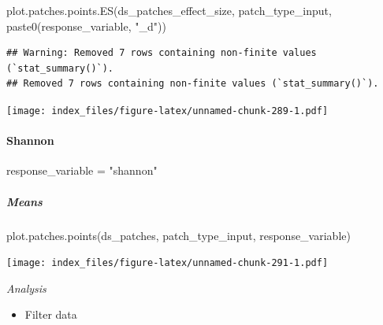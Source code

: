 \documentclass[
]{article}
\newenvironment{Shaded}{\begin{snugshade}}{\end{snugshade}}
\newcommand{\FunctionTok}[1]{\textcolor[rgb]{0.00,0.00,0.00}{#1}}
\newcommand{\NormalTok}[1]{#1}
\newcommand{\OtherTok}[1]{\textcolor[rgb]{0.56,0.35,0.01}{#1}}
\newcommand{\StringTok}[1]{\textcolor[rgb]{0.31,0.60,0.02}{#1}}
\providecommand{\tightlist}{%
  \setlength{\itemsep}{0pt}\setlength{\parskip}{0pt}}
\begin{document}
\begin{Shaded}
\begin{Highlighting}[]
\FunctionTok{plot.patches.points.ES}\NormalTok{(ds\_patches\_effect\_size, patch\_type\_input,}
                       \FunctionTok{paste0}\NormalTok{(response\_variable, }\StringTok{"\_d"}\NormalTok{))}
\end{Highlighting}
\end{Shaded}

\begin{verbatim}
## Warning: Removed 7 rows containing non-finite values (`stat_summary()`).
## Removed 7 rows containing non-finite values (`stat_summary()`).
\end{verbatim}

\texttt{[image: index\_files/figure-latex/unnamed-chunk-289-1.pdf]}

\hypertarget{shannon-3}{%
\paragraph{Shannon}\label{shannon-3}}

\begin{Shaded}
\begin{Highlighting}[]
\NormalTok{response\_variable }\OtherTok{=} \StringTok{"shannon"}
\end{Highlighting}
\end{Shaded}

\hypertarget{means-17}{%
\subparagraph{Means}\label{means-17}}

\begin{Shaded}
\begin{Highlighting}[]
\FunctionTok{plot.patches.points}\NormalTok{(ds\_patches, patch\_type\_input,}
\NormalTok{                       response\_variable)}
\end{Highlighting}
\end{Shaded}

\texttt{[image: index\_files/figure-latex/unnamed-chunk-291-1.pdf]}

\emph{Analysis}

\begin{itemize}
\tightlist
\item
  Filter data
\end{itemize}
\end{document}
